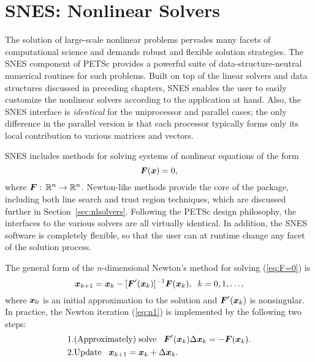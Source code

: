 \chapter{SNES: Nonlinear Solvers}
\label{chapter:snes}

The solution of large-scale nonlinear problems pervades many facets of
computational science and demands robust and flexible solution
strategies. The SNES component of PETSc provides a powerful suite of
data-structure-neutral numerical routines for such problems.  Built on
top of the linear solvers and data structures discussed in preceding
chapters, SNES enables the user to easily customize the nonlinear
solvers according to the application at hand.  Also, the SNES
interface is {\em identical} for the uniprocessor and parallel cases;
the only difference in the parallel version is that each processor
typically forms only its local contribution to various matrices and
vectors.

SNES includes methods for solving systems of nonlinear equations of the form 
\begin{equation}
\mbox{\boldmath \(F\)}(\mbox{\boldmath \(x\)}) = 0,
\label{eq:F=0}
\end{equation}
where $\mbox{\boldmath \(F\)}: \, \mathbb R^n \rightarrow \mathbb R^n$.
Newton-like methods provide the core of the package, including
 both line search  
and trust region  techniques, which are discussed
further in Section~\ref{sec:nlsolvers}. Following the
PETSc design philosophy, the interfaces to the various solvers are all
virtually identical. In addition, the SNES software is completely
flexible, so that the user can at runtime change any facet of the
solution process.

The general form of the $n$-dimensional Newton's method for solving
(\ref{eq:F=0}) is
\begin{equation}
     \mbox{\boldmath \(x\)}_{k+1} = \mbox{\boldmath \(x\)}_k - [ \mbox{\boldmath \(F\)}'(\mbox{\boldmath \(x\)}_k)]^{-1} \mbox{\boldmath \(F\)}(\mbox{\boldmath \(x\)}_k), \;\; k=0,1, \ldots, 
\label{eq:n1}
\end{equation}
where $ \mbox{\boldmath \(x\)}_0 $ is an initial approximation to the solution and   
$ \mbox{\boldmath \(F\)}'(\mbox{\boldmath \(x\)}_k) $ is nonsingular.  
In practice, the Newton iteration (\ref{eq:n1}) is implemented by
the following two steps:
\begin{eqnarray}
  1. & {\rm (Approximately) \;solve\;\;\;} \mbox{\boldmath \(F\)}'(\mbox{\boldmath \(x\)}_k) \Delta \mbox{\boldmath \(x\)}_k = -\mbox{\boldmath \(F\)}(\mbox{\boldmath \(x\)}_k).\\
  2. & {\rm Update\;\;\;} \mbox{\boldmath \(x\)}_{k+1} = \mbox{\boldmath \(x\)}_k + \Delta \mbox{\boldmath \(x\)}_k. \hspace{.225in}
\end{eqnarray}



